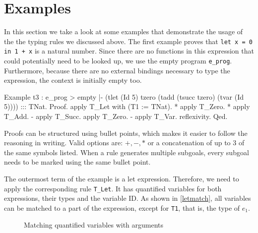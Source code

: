 \documentclass[paper = a4, fleqn, abstract=on, twoside]{scrreprt}
\newcommand{\coqinline}[1]{\texttt{#1}}
\begin{document}
\section{Examples}
In this section we take a look at some examples that demonstrate the usage of the the typing rules we discussed above. The first example proves that \texttt{let x = 0 in 1 + x} is a natural number. Since there are no functions in this expression that could potentially need to be looked up, we use the empty program \texttt{e\_prog}. Furthermore, because there are no external bindings necessary to type the expression, the context is initially empty too.
\begin{coqcode}
Example t3 : e_prog > empty |- (tlet (Id 5) tzero 
                                     (tadd (tsucc tzero) 
                                           (tvar (Id 5)))) ::: TNat.
Proof. 
  apply T_Let with (T1 := TNat).
    * apply T_Zero.
    * apply T_Add.
      - apply T_Succ. apply T_Zero.
      - apply T_Var. reflexivity.
Qed.
\end{coqcode}
Proofs can be structured using bullet points, which makes it easier to follow the reasoning in writing. Valid options are: $+, -, *$ or a concatenation of up to 3 of the same symbols listed. When a rule generates multiple subgoals, every subgoal needs to be marked using the same bullet point.
\par
The outermost term of the example is a let expression. Therefore, we need to apply the corresponding rule \coqinline{T_Let}. It has quantified variables for both expressions, their types and the variable ID. As shown in \autoref{letmatch}, all variables can be matched to a part of the expression, except for \coqinline{T1}, that is, the type of $e_{1}$.
\begin{figure}[H]
	\caption{Matching quantified variables with arguments}
	\label{letmatch}
\end{figure}\noindent
\end{document}
